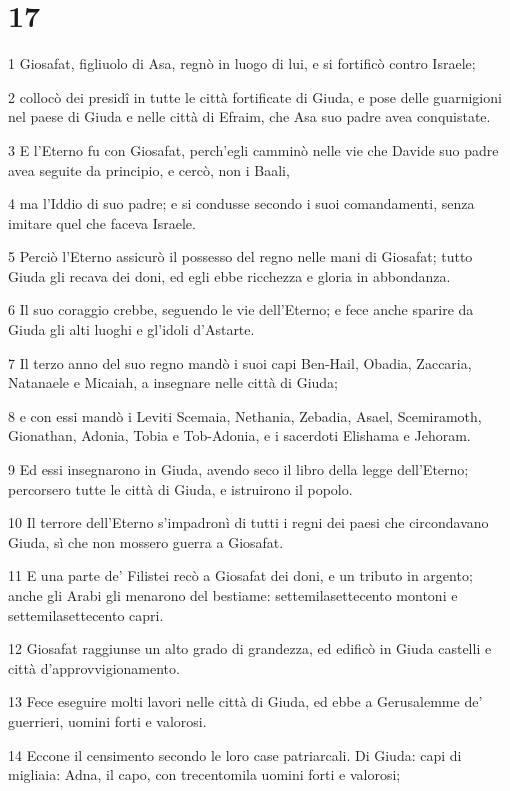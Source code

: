 \chapter{17}

\par 1 Giosafat, figliuolo di Asa, regnò in luogo di lui, e si fortificò contro Israele;
\par 2 collocò dei presidî in tutte le città fortificate di Giuda, e pose delle guarnigioni nel paese di Giuda e nelle città di Efraim, che Asa suo padre avea conquistate.
\par 3 E l'Eterno fu con Giosafat, perch'egli camminò nelle vie che Davide suo padre avea seguite da principio, e cercò, non i Baali,
\par 4 ma l'Iddio di suo padre; e si condusse secondo i suoi comandamenti, senza imitare quel che faceva Israele.
\par 5 Perciò l'Eterno assicurò il possesso del regno nelle mani di Giosafat; tutto Giuda gli recava dei doni, ed egli ebbe ricchezza e gloria in abbondanza.
\par 6 Il suo coraggio crebbe, seguendo le vie dell'Eterno; e fece anche sparire da Giuda gli alti luoghi e gl'idoli d'Astarte.
\par 7 Il terzo anno del suo regno mandò i suoi capi Ben-Hail, Obadia, Zaccaria, Natanaele e Micaiah, a insegnare nelle città di Giuda;
\par 8 e con essi mandò i Leviti Scemaia, Nethania, Zebadia, Asael, Scemiramoth, Gionathan, Adonia, Tobia e Tob-Adonia, e i sacerdoti Elishama e Jehoram.
\par 9 Ed essi insegnarono in Giuda, avendo seco il libro della legge dell'Eterno; percorsero tutte le città di Giuda, e istruirono il popolo.
\par 10 Il terrore dell'Eterno s'impadronì di tutti i regni dei paesi che circondavano Giuda, sì che non mossero guerra a Giosafat.
\par 11 E una parte de' Filistei recò a Giosafat dei doni, e un tributo in argento; anche gli Arabi gli menarono del bestiame: settemilasettecento montoni e settemilasettecento capri.
\par 12 Giosafat raggiunse un alto grado di grandezza, ed edificò in Giuda castelli e città d'approvvigionamento.
\par 13 Fece eseguire molti lavori nelle città di Giuda, ed ebbe a Gerusalemme de' guerrieri, uomini forti e valorosi.
\par 14 Eccone il censimento secondo le loro case patriarcali. Di Giuda: capi di migliaia: Adna, il capo, con trecentomila uomini forti e valorosi;
